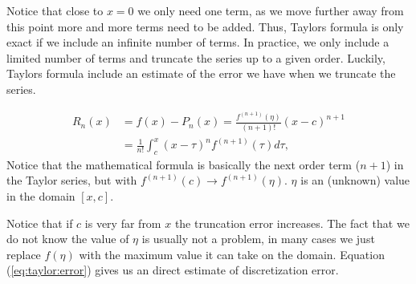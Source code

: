 \documentclass[graybox,sectrefs,envcountresetchap,open=right,final]{svmonodo}
\newenvironment{graybox2admon}[1][]{
\begin{graybox2mdframed}[frametitle=#1]
}
{
\end{graybox2mdframed}
}
\begin{document}
Notice that close to $x=0$ we only need one term, as we move further away from this point more and more terms need to be added. Thus, Taylors formula is only exact if we include an infinite number of terms. In practice, we only include a limited number of terms and truncate the series up to a given order. Luckily, Taylors formula include an estimate of the error we have when we truncate the series. 


\begin{graybox2admon}[Truncation error in Taylors formula:]
\begin{align}
R_n(x)&=f(x)-P_n(x)=\frac{f^{(n+1)}(\eta)}{(n+1)!}(x-c)^{n+1}\nonumber\\ 
      &=\frac{1}{n!}\int_c^x(x-\tau)^{n}f^{(n+1)}(\tau)d\tau,\label{eq:taylor:error}
\end{align}
Notice that the mathematical formula is basically the next order term ($n+1$) in the Taylor series, but with $f^{(n+1)}(c)\to f^{(n+1)}(\eta)$. $\eta$ is an (unknown) value in the domain $[x,c]$.
\end{graybox2admon}



Notice that if $c$ is very far from $x$ the truncation error increases. The fact that we do not know the value of $\eta$ is usually not a problem, in many cases we just replace $f(\eta)$ with the maximum value it can take on the domain. Equation (\ref{eq:taylor:error}) gives us an direct estimate of discretization error. 
\end{document}
